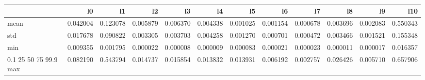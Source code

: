 \begin{tabular}{lrrrrrrrrrrr}
\toprule
 & l0 & l1 & l2 & l3 & l4 & l5 & l6 & l7 & l8 & l9 & l10 \\
\midrule
mean & 0.042004 & 0.123078 & 0.005879 & 0.006370 & 0.004338 & 0.001025 & 0.001154 & 0.000678 & 0.003696 & 0.002083 & 0.550343 \\
std & 0.017678 & 0.090822 & 0.003305 & 0.003703 & 0.004258 & 0.001270 & 0.000701 & 0.000472 & 0.003466 & 0.001521 & 0.155348 \\
min & 0.009355 & 0.001795 & 0.000022 & 0.000008 & 0.000009 & 0.000083 & 0.000021 & 0.000023 & 0.000011 & 0.000017 & 0.016357 \\
0.1%
25%
50%
75%
99.9%
max & 0.082190 & 0.543794 & 0.014737 & 0.015854 & 0.013832 & 0.013931 & 0.006192 & 0.002757 & 0.026426 & 0.005710 & 0.657906 \\
\bottomrule
\end{tabular}
